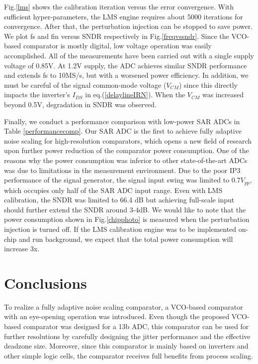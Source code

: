 \documentclass[letterpaper, 10 pt, conference]{ieeeconf}  %
\begin{document}
Fig.\ref{lms} shows the calibration iteration versus the error convergence. With sufficient hyper-parameters, the LMS engine requires about 5000 iterations for convergence. After that, the perturbation injection can be stopped to save power. 
We plot fs and fin versus SNDR respectively in Fig.\ref{freqvssndr}. Since the VCO-based comparator is mostly digital, low voltage operation was easily accomplished. All of the measurements have been carried out with a single supply voltage of 0.85V. At 1.2V supply, the ADC achieves similar SNDR performance and extends fs to 10MS/s, but with a worsened power efficiency. In addition, we must be careful of the signal common-mode voltage ($V_{CM}$) since this directly impacts the inverter’s $I_{DS}$ in eq.(\ref{delaylineIRN}). When the $V_{CM}$ was increased beyond 0.5V, degradation in SNDR was observed.

Finally, we conduct a performance comparison with low-power SAR ADCs in Table \ref{performancecomp}. Our SAR ADC is the first to achieve fully adaptive noise scaling for high-resolution comparators, which opens a new field of research upon further power reduction of the comparator power consumption. 
One of the reasons why the power consumption was inferior to other state-of-the-art ADCs was due to limitations in the measurement environment. Due to the poor IP3 performance of the signal generator, the signal input swing was limited to $0.7V_{pp}$, which occupies only half of the SAR ADC input range. Even with LMS calibration, the SNDR was limited to 66.4 dB but achieving full-scale input should further extend the SNDR around 3-4dB. We would like to note that the power consumption shown in Fig.\ref{chipphoto} is measured when the perturbation injection is turned off. If the LMS calibration engine was to be implemented on-chip and run background, we expect that the total power consumption will increase 3x. 

\section{Conclusions}
To realize a fully adaptive noise scaling comparator, a VCO-based comparator with an eye-opening operation was introduced.  Even though the proposed VCO-based comparator was designed for a 13b ADC, this comparator can be used for further resolutions by carefully designing the jitter performance and the effective deadzone size. Moreover, since this comparator is mainly based on inverters and other simple logic cells, the comparator receives full benefits from process scaling. %
\end{document}
